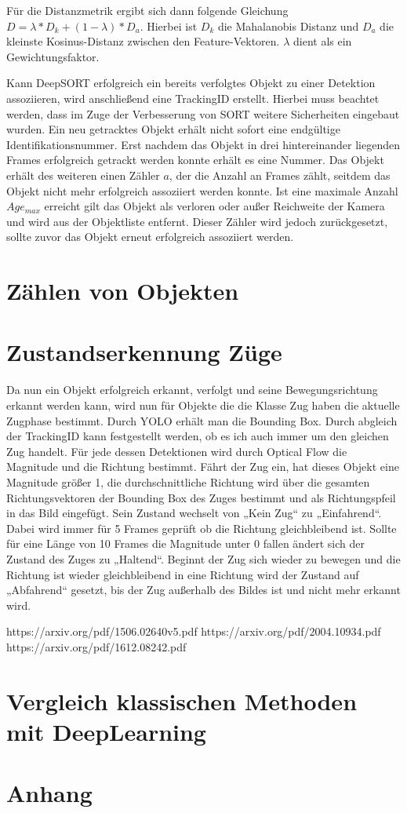 \documentclass[conference]{IEEEtran}
\begin{document}
	Für die Distanzmetrik ergibt sich dann folgende Gleichung
	$D = \lambda * D_k + (1-\lambda) * D_a$. Hierbei ist $D_k$ die Mahalanobis Distanz und $D_a$ die kleinste Kosinus-Distanz zwischen den Feature-Vektoren. $\lambda$ dient als ein Gewichtungsfaktor.
	
	Kann DeepSORT erfolgreich ein bereits verfolgtes Objekt zu einer Detektion assoziieren, wird anschließend eine TrackingID erstellt. Hierbei muss beachtet werden, dass im Zuge der Verbesserung von SORT weitere Sicherheiten eingebaut wurden. Ein neu getracktes Objekt erhält nicht sofort eine endgültige Identifikationsnummer. Erst nachdem das Objekt in drei hintereinander liegenden Frames erfolgreich getrackt werden konnte erhält es eine Nummer. Das Objekt erhält des weiteren einen Zähler $a$, der die Anzahl an Frames zählt, seitdem das Objekt nicht mehr erfolgreich assoziiert werden konnte. Ist eine maximale Anzahl $Age_{max}$ erreicht gilt das Objekt als verloren oder außer Reichweite der Kamera und wird aus der Objektliste entfernt. Dieser Zähler wird jedoch zurückgesetzt, sollte zuvor das Objekt erneut erfolgreich assoziiert werden.
	
	\section{Zählen von Objekten}
	
	\section{Zustandserkennung Züge}
	Da nun ein Objekt erfolgreich erkannt, verfolgt und seine Bewegungsrichtung erkannt werden kann, wird nun für Objekte die die Klasse Zug haben die aktuelle Zugphase bestimmt. 
	Durch YOLO erhält man die Bounding Box. Durch abgleich der TrackingID kann festgestellt werden, ob es ich auch immer um den gleichen Zug handelt. Für jede dessen Detektionen wird durch Optical Flow die Magnitude und die Richtung bestimmt. Fährt der Zug ein, hat dieses Objekt eine Magnitude größer 1, die durchschnittliche Richtung wird über die gesamten Richtungsvektoren der Bounding Box des Zuges bestimmt und als Richtungspfeil in das Bild eingefügt. Sein Zustand wechselt von „Kein Zug“ zu „Einfahrend“. Dabei wird immer für 5 Frames geprüft ob die Richtung gleichbleibend ist. Sollte für eine Länge von 10 Frames die Magnitude unter 0 fallen ändert sich der Zustand des Zuges zu „Haltend“. Beginnt der Zug sich wieder zu bewegen und die Richtung ist wieder gleichbleibend in eine Richtung wird der Zustand auf „Abfahrend“ gesetzt, bis der Zug außerhalb des Bildes ist und nicht mehr erkannt wird.
	
	\begin{thebibliography}{00}
		https://arxiv.org/pdf/1506.02640v5.pdf
		https://arxiv.org/pdf/2004.10934.pdf
		https://arxiv.org/pdf/1612.08242.pdf
	\end{thebibliography}
	
	\section{Vergleich klassischen Methoden mit DeepLearning}
	
	\section{Anhang}
	
\end{document}
